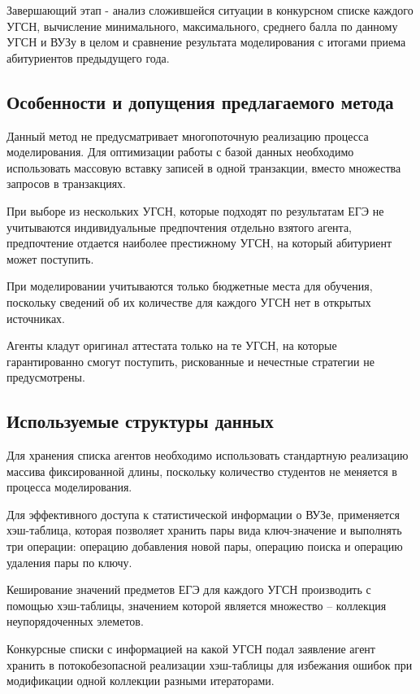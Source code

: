 Завершающий этап - анализ сложившейся ситуации в конкурсном списке каждого УГСН, вычисление минимального, максимального, среднего балла по данному УГСН и ВУЗу в целом и сравнение результата моделирования с итогами приема абитуриентов предыдущего года.

\subsection{Особенности и допущения предлагаемого метода}

Данный метод не предусматривает многопоточную реализацию процесса моделирования. Для оптимизации работы с базой данных необходимо использовать массовую вставку записей в одной транзакции, вместо множества запросов в транзакциях. 

При выборе из нескольких УГСН, которые подходят по результатам ЕГЭ не учитываются индивидуальные предпочтения отдельно взятого агента, предпочтение отдается наиболее престижному УГСН, на который абитуриент может поступить. 

При моделировании учитываются только бюджетные места для обучения, поскольку сведений об их количестве для каждого УГСН нет в открытых источниках.

Агенты кладут оригинал аттестата только на те УГСН, на которые гарантированно смогут поступить, рискованные и нечестные стратегии не предусмотрены.

\subsection{Используемые структуры данных}

Для хранения списка агентов необходимо использовать стандартную реализацию массива фиксированной длины, поскольку количество студентов не меняется в процесса моделирования.

Для эффективного доступа к статистической информации о ВУЗе, применяется хэш-таблица, которая позволяет хранить пары вида ключ-значение и выполнять три операции: операцию добавления новой пары, операцию поиска и операцию удаления пары по ключу.

Кеширование значений предметов ЕГЭ для каждого УГСН производить с помощью хэш-таблицы, значением которой является множество – коллекция неупорядоченных элеметов.

Конкурсные списки с информацией на какой УГСН подал заявление агент хранить в потокобезопасной реализации хэш-таблицы для избежания ошибок при модификации одной коллекции разными итераторами.



\pagebreak